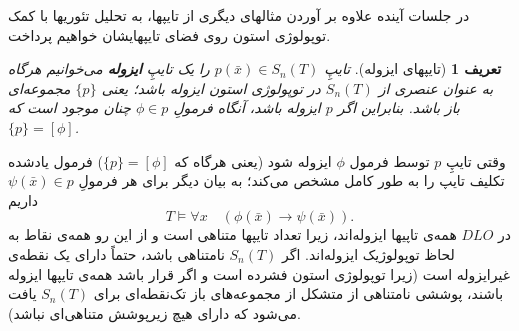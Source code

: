 \documentclass[12pt,a4paper]{report}
\theoremstyle{colorhead}
\newtheorem{defn}[thm]{تعریف}
\begin{document}
در جلسات آینده علاوه بر آوردن مثالهای دیگری از تایپها، به تحلیل تئوریها 
با کمک توپولوژی استون روی فضای تایپهایشان خواهیم پرداخت. 
\begin{defn}[تایپهای ایزوله]
تایپِ
$p(\bar{x})\in S_n(T)$
را یک تایپِ
\textbf{ایزوله}
می‌خوانیم هرگاه به عنوان عنصری از
$S_n(T)$
در توپولوژی استون ایزوله باشد؛ یعنی
$\{p\}$
مجموعه‌ای باز باشد. بنابراین اگر
$p$
ایزوله باشد، آنگاه فرمولِ
$\phi\in p$
چنان موجود است که 
$\{p\}=[\phi]$.
\end{defn}
وقتی تایپِ
$p$
توسط فرمول
$\phi$
ایزوله شود (یعنی هرگاه که 
$\{p\}=[\phi]$)
فرمول یادشده تکلیف تایپ را به طور کامل مشخص می‌کند؛ به بیان دیگر برای هر فرمولِ
$\psi(\bar{x})\in p$
داریم
\[
T\models \forall x\quad (\phi(\bar{x})\to \psi(\bar{x})).
\]
در
$DLO$
همه‌ی تاپیها ایزوله‌اند، زیرا تعداد تایپها متناهی است و از این رو همه‌ی نقاط به لحاظ توپولوژیک ایزوله‌اند. 
اگر
$S_n(T)$
نامتناهی باشد، حتماً دارای یک نقطه‌ی غیرایزوله است (زیرا توپولوژی استون فشرده است و اگر قرار باشد همه‌ی تایپها ایزوله باشند، پوششی نامتناهی از متشکل از 
مجموعه‌های باز تک‌نقطه‌ای برای
$S_n(T)$
یافت می‌شود که دارای هیچ‌ زیرپوشش متناهی‌ای نباشد).
\end{document}
